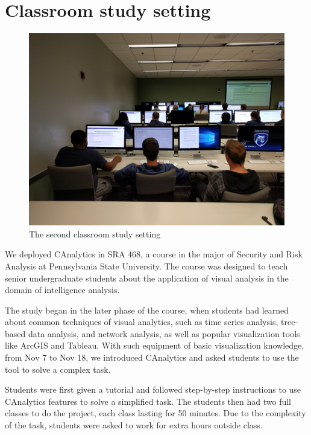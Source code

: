 \section{Classroom study setting}

 \begin{figure}
	\centering
	\includegraphics[width=.8\columnwidth]{05-Study_two/img/classroom_setting_2.jpg}
	\caption{The second classroom study setting}\label{fig:classroom2}
\end{figure}

We deployed CAnalytics in SRA 468, a course in the major of Security and Risk Analysis at Pennsylvania State University. The course was designed to teach senior undergraduate students about the application of visual analysis in the domain of intelligence analysis.

The study began in the later phase of the course, when students had learned about common techniques of visual analytics, such as time series analysis, tree-based data analysis, and network analysis, as well as popular visualization tools like ArcGIS and Tableau. With such equipment of basic visualization knowledge, from Nov 7 to Nov 18, we introduced CAnalytics and asked students to use the tool to solve a complex task.

Students were first given a tutorial and followed step-by-step instructions to use CAnalytics features to solve a simplified task. The students then had two full classes to do the project, each class lasting for 50 minutes. Due to the complexity of the task, students were asked to work for extra hours outside class.

